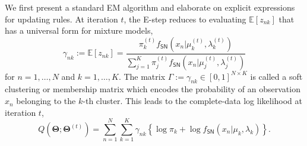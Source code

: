 \documentclass[11pt]{article}
\newcommand{\bbE}{\mathbb{E}}
\newcommand{\bfTheta}{\mathbf{\Theta}}
\begin{document}
We first present a standard EM algorithm and elaborate on explicit expressions for updating rules. At iteration $t$, the E-step reduces to evaluating $\bbE[z_{nk}]$ that has a universal form for mixture models,
\begin{equation}\label{clustering:Estep_soft}
\gamma_{nk} := \bbE[z_{nk}] = \frac{\pi_k^{(t)} f_{\textsf{SN}} (x_n\vert \mu_k^{(t)}, \lambda_k^{(t)})}{\sum_{j=1}^K \pi_j^{(t)} f_{\textsf{SN}} (x_n\vert \mu_j^{(t)}, \lambda_j^{(t)})}
\end{equation}
for $n=1,\ldots,N$ and $k=1,\ldots,K$. The matrix $\Gamma := \gamma_{nk} \in [0,1]^{N\times K}$ is called a soft clustering or membership matrix which encodes the probability of an observation $x_n$ belonging to the $k$-th cluster. This leads to the complete-data log likelihood at iteration $t$,
\begin{equation}\label{clustering:rule_M_equation}
Q(\bfTheta; \bfTheta^{(t)}) = \sum_{n=1}^N \sum_{k=1}^K \gamma_{nk} \left\lbrace \log \pi_k + \log f_{\textsf{SN}} (x_n\vert \mu_k, \lambda_k) \right\rbrace.
\end{equation}
\end{document}
